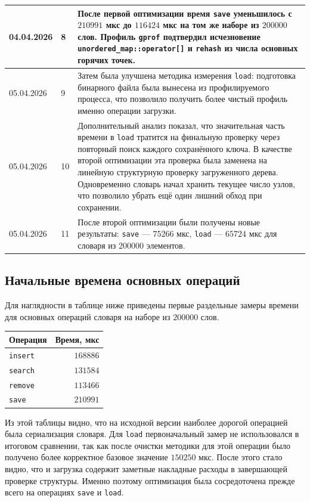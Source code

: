 \begin{longtable}{|p{}|p{}|p{}|}
04.04.2026 & 8 &
После первой оптимизации время \texttt{save} уменьшилось с \(210991\) мкс до \(116424\) мкс на том же наборе из \(200000\) слов. Профиль \texttt{gprof} подтвердил исчезновение \texttt{unordered\_map::operator[]} и \texttt{rehash} из числа основных горячих точек. \\
\hline

05.04.2026 & 9 &
Затем была улучшена методика измерения \texttt{load}: подготовка бинарного файла была вынесена из профилируемого процесса, что позволило получить более чистый профиль именно операции загрузки. \\
\hline

05.04.2026 & 10 &
Дополнительный анализ показал, что значительная часть времени в \texttt{load} тратится на финальную проверку через повторный поиск каждого сохранённого ключа. В качестве второй оптимизации эта проверка была заменена на линейную структурную проверку загруженного дерева. Одновременно словарь начал хранить текущее число узлов, что позволило убрать ещё один лишний обход при сохранении. \\
\hline

05.04.2026 & 11 &
После второй оптимизации были получены новые результаты: \texttt{save} --- \(75266\) мкс, \texttt{load} --- \(65724\) мкс для словаря из \(200000\) элементов. \\
\bottomrule
\end{longtable}

\subsection{Начальные времена основных операций}

Для наглядности в таблице ниже приведены первые раздельные замеры времени для основных операций словаря на наборе из \(200000\) слов.

\begin{center}
\begin{tabular}{lr}
\toprule
Операция & Время, мкс \\
\midrule
\texttt{insert} & \(168886\) \\
\texttt{search} & \(131584\) \\
\texttt{remove} & \(113466\) \\
\texttt{save} & \(210991\) \\
\bottomrule
\end{tabular}
\end{center}

Из этой таблицы видно, что на исходной версии наиболее дорогой операцией была сериализация словаря. Для \texttt{load} первоначальный замер не использовался в итоговом сравнении, так как после очистки методики для этой операции было получено более корректное базовое значение \(150250\) мкс. После этого стало видно, что и загрузка содержит заметные накладные расходы в завершающей проверке структуры. Именно поэтому оптимизация была сосредоточена прежде всего на операциях \texttt{save} и \texttt{load}.

